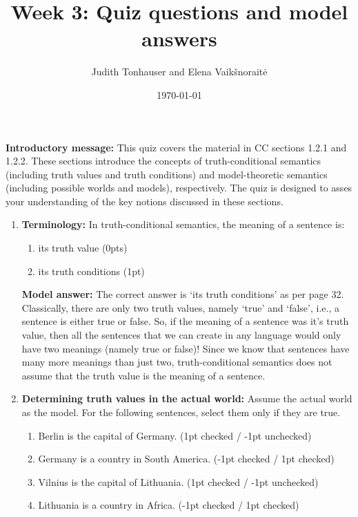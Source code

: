 \documentclass[a4,11pt]{article}
\title{Week 3: Quiz questions and model answers}
\author{Judith Tonhauser and Elena Vaik\v snorait\.{e} }
\date{\today}
\begin{document}
\maketitle


{\bf Introductory message:} This quiz covers the material in CC sections 1.2.1 and 1.2.2. These sections introduce the concepts of truth-conditional semantics (including truth values and truth conditions) and model-theoretic semantics (including possible worlds and models), respectively. The quiz is designed to asses your understanding of the key notions discussed in these sections. 

\begin{enumerate}[leftmargin = 12pt]

  \item {\bf Terminology:}  In truth-conditional semantics, the meaning of a sentence is:
         \begin{enumerate}[noitemsep]
       \item its truth value (0pts) 
        \item its truth conditions (1pt)
   \end{enumerate}
   
 {\bf Model answer:} The correct answer is `its truth conditions' as per page 32. Classically, there are only two truth values, namely `true' and `false', i.e., a sentence is either true or false. So, if the meaning of a sentence was it's truth value, then all the sentences that we can create in any language would only have two meanings (namely true or false)! Since we know that sentences have many more meanings than just two, truth-conditional semantics does not assume that the truth value is the meaning of a sentence. 

\item {\bf Determining truth values in the actual world:} Assume the actual world as the model. For the following sentences, select them only if they are true. 

      \begin{enumerate}[noitemsep]
        \item Berlin is the capital of Germany. (1pt checked / -1pt unchecked)
        \item Germany is a country in South America. (-1pt checked / 1pt checked)
        \item Vilnius is the capital of Lithuania. (1pt checked / -1pt unchecked)
        \item Lithuania is a country in Africa. (-1pt checked / 1pt checked)
         \end{enumerate}
         

\end{enumerate}
\end{document}
